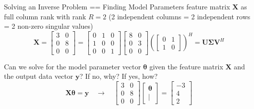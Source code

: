 \documentclass[mathserif, aspectratio=1610]{intbeamer}
\begin{document}
\begin{frame}[t]{Solving an Inverse Problem == Finding Model Parameters}
feature matrix $\bm{X}$ as full column rank with rank $R=2$ (2 independent columns = 2 independent rows = 2 non-zero singular values)
$$
\bm{X} =
\begin{bmatrix}
3 & 0 \\ 0 & 8 \\ 0 & 0
\end{bmatrix}
=
\begin{bmatrix}
0 & 1 & 0 \\
1 & 0 & 0 \\
0 & 0 & 1
\end{bmatrix}
%
\begin{bmatrix}
8 & 0\\
0 & 3\\
0 & 0
\end{bmatrix}
%
\left(
\begin{bmatrix}
0 & 1\\
1 & 0
\end{bmatrix}
\right)^H=
\bm{U} \bm{\Sigma} \bm{V}^H
$$

Can we solve for the model parameter vector $\bm{\theta}$ given the feature matrix $\bm{X}$ and the output data vector $\bm{y}$?
%
If no, why? If yes, how?
$$
\bm{X} \bm{\theta} = \bm{y}
\quad \rightarrow \quad
\begin{bmatrix}
3 & 0 \\ 0 & 8 \\ 0 & 0
\end{bmatrix}
\begin{bmatrix}
\bm{\theta} \\ |
\end{bmatrix}=
\begin{bmatrix}
-3 \\ 4 \\ 2
\end{bmatrix}
$$

\end{frame}
\end{document}
